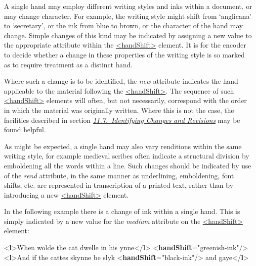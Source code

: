 \par
A single hand may employ different writing styles and inks within a document, or may change character. For example, the writing style might shift from ‘anglicana’ to ‘secretary’, or the ink from blue to brown, or the character of the hand may change. Simple changes of this kind may be indicated by assigning a new value to the appropriate attribute within the \hyperref[TEI.handShift]{<handShift>} element. It is for the encoder to decide whether a change in these properties of the writing style is so marked as to require treatment as a distinct hand.\par
Where such a change is to be identified, the {\itshape new} attribute indicates the hand applicable to the material following the \hyperref[TEI.handShift]{<handShift>}. The sequence of such \hyperref[TEI.handShift]{<handShift>} elements will often, but not necessarily, correspond with the order in which the material was originally written. Where this is not the case, the facilities described in section \textit{\hyperref[PH-changes]{11.7.\ Identifying Changes and Revisions}} may be found helpful.\par
As might be expected, a single hand may also vary renditions within the same writing style, for example medieval scribes often indicate a structural division by emboldening all the words within a line. Such changes should be indicated by use of the {\itshape rend} attribute, in the same manner as underlining, emboldening, font shifts, etc. are represented in transcription of a printed text, rather than by introducing a new \hyperref[TEI.handShift]{<handShift>} element.\par
In the following example there is a change of ink within a single hand. This is simply indicated by a new value for the {\itshape medium} attribute on the \hyperref[TEI.handShift]{<handShift>} element: \par\bgroup{}\exampleFont \begin{shaded}\noindent\mbox{}{<\textbf{l}>}When wolde the cat dwelle in his ynne{</\textbf{l}>}\mbox{}\newline 
{<\textbf{handShift}\hspace*{1em}{medium}="{greenish-ink}"/>}\mbox{}\newline 
{<\textbf{l}>}And if the cattes skynne be slyk {<\textbf{handShift}\hspace*{1em}{medium}="{black-ink}"/>} and\mbox{}\newline 
 gaye{</\textbf{l}>}\end{shaded}\egroup\par \par
